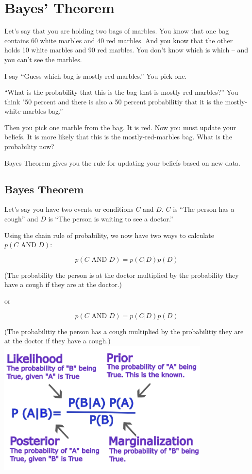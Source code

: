 \chapter{Bayes' Theorem}

Let's say that you are holding two bags of marbles.
You know that one bag contains 60 white marbles and 40 red marbles. And you
know that the other holds 10 white marbles and 90 red marbles. You
don't know which is which -- and you can't see the marbles.

I say ``Guess which bag is mostly red marbles.'' You pick one.

``What is the probability that this is the bag that is mostly red marbles?''
 You think "50 percent and there is
also a 50 percent probabilitiy that it is the mostly-white-marbles bag.''

Then you pick one marble from the bag. It is red. Now you must
update your beliefs. It is more likely that this is the
mostly-red-marbles bag. What is the probability now?

Bayes Theorem gives you the rule for updating your beliefs based on
new data.

\section{Bayes Theorem}

Let's say you have two events or conditions $C$ and $D$. $C$ is
``The person has a cough'' and $D$ is ``The person is waiting to see a doctor.''

Using the chain rule of probability, we now have two ways to calculate $p(C \text{ AND } D)$:

$$p(C \text{ AND } D) = p(C | D) p(D)$$

(The probability the person is at the doctor multiplied by the probability they have a cough if they are at the doctor.)

or 

$$p(C \text{ AND } D) = p(C | D) p(D)$$

(The probabilitiy the person has a cough multiplied by the probabilitiy they are at the doctor if they have a cough.)
\includegraphics[width=0.8\textwidth]{Probability.png}

